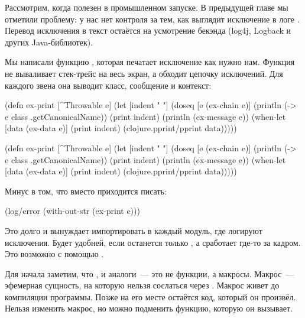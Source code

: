 \label{install-logger}


Рассмотрим, когда  полезен в промышленном запуске. В
предыдущей главе мы отметили проблему: у нас нет контроля за тем, как выглядит
исключение в логе . Перевод исключения в текст остаётся на
усмотрение бекэнда (log4j, Logback и других Java-библиотек).

Мы написали функцию , которая печатает исключение как нужно
нам. Функция не вываливает стек-трейс на весь экран, а обходит цепочку
исключений. Для каждого звена она выводит класс, сообщение и контекст:

\ifnarrow

\begin{clojure}
(defn ex-print
  [^Throwable e]
  (let [indent "  "]
    (doseq [e (ex-chain e)]
      (println (-> e
                   class
                   .getCanonicalName))
      (print indent)
      (println (ex-message e))
      (when-let [data (ex-data e)]
        (print indent)
        (clojure.pprint/pprint data)))))
\end{clojure}

\else

\begin{clojure}
(defn ex-print
  [^Throwable e]
  (let [indent "  "]
    (doseq [e (ex-chain e)]
      (println (-> e class .getCanonicalName))
      (print indent)
      (println (ex-message e))
      (when-let [data (ex-data e)]
        (print indent)
        (clojure.pprint/pprint data)))))
\end{clojure}

\fi

\noindent
Минус в том, что вместо  приходится писать:

\begin{clojure}
(log/error (with-out-str (ex-print e)))
\end{clojure}

Это долго и вынуждает импортировать  в каждый модуль, где логируют
исключения. Будет удобней, если останется только , а
 сработает где-то за кадром. Это возможно с помощью
.

Для начала заметим, что ,  и аналоги~--- это не
функции, а макросы. Макрос~--- эфемерная сущность, на которую нельзя сослаться
через . Макрос живет до компиляции программы. Позже на его месте
остаётся код, который он произвёл. Нельзя изменить макрос, но можно подменить
функцию, которую он вызывает.

